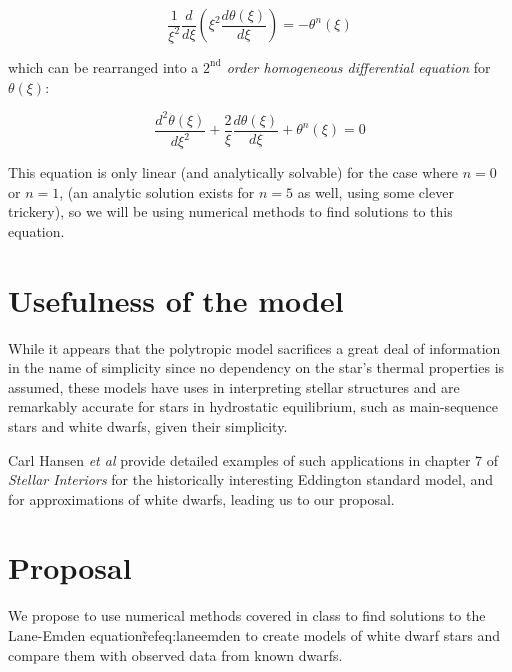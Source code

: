 \documentclass{article}
\begin{document}
            \begin{equation}
                \frac{1}{\xi^2}\frac{d}{d\xi}\left(\xi^2\frac{d\theta(\xi)}{d\xi}\right)=-\theta^n(\xi)
            \end{equation}

            which can be rearranged into a \textit{\(\mathrm{2^{nd}}\) order homogeneous differential
            equation} for \(\theta(\xi)\):

            \begin{equation}
                \label{eq:lede}
                \frac{d^2\theta(\xi)}{d\xi^2}+\frac{2}{\xi}\frac{d\theta(\xi)}{d\xi}+\theta^n(\xi)=0
            \end{equation}

            This equation is only linear (and analytically solvable) for the
            case where \(n=0\) or \(n=1\), (an analytic solution exists for
            \(n=5\) as well, using some clever trickery), so we will be using
            numerical methods to find solutions to this equation.

    \section{Usefulness of the model}

        While it appears that the polytropic model sacrifices a great deal of
        information in the name of simplicity since no dependency on the star's
        thermal properties is assumed, these models have uses in interpreting
        stellar structures and are remarkably accurate for stars in hydrostatic
        equilibrium, such as main-sequence stars and white dwarfs, given their
        simplicity\cite[p.332]{hansen2004}.

        Carl Hansen \textit{et al} provide detailed examples of such
        applications in chapter 7 of \textit{Stellar Interiors}\cite{hansen2004}
        for the historically interesting Eddington standard model, and for
        approximations of white dwarfs, leading us to our proposal.

    \section{Proposal}

        We propose to use numerical methods covered in class to find solutions
        to the Lane-Emden equation\~ref{eq:laneemden} to create models of white
        dwarf stars and compare them with observed data from known dwarfs.
\end{document}
